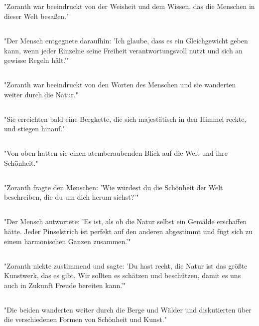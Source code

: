 \documentclass{article}
\begin{document}
\subsection{}
"Zoranth war beeindruckt von der Weisheit und dem Wissen, das die Menschen in dieser Welt besaßen."
\subsection{}
"Der Mensch entgegnete daraufhin: 'Ich glaube, dass es ein Gleichgewicht geben kann, wenn jeder Einzelne seine Freiheit verantwortungsvoll nutzt und sich an gewisse Regeln hält.'"
\subsection{}
"Zoranth war beeindruckt von den Worten des Menschen und sie wanderten weiter durch die Natur."
\subsection{}
"Sie erreichten bald eine Bergkette, die sich majestätisch in den Himmel reckte, und stiegen hinauf."
\subsection{}
"Von oben hatten sie einen atemberaubenden Blick auf die Welt und ihre Schönheit."
\subsection{}
"Zoranth fragte den Menschen: 'Wie würdest du die Schönheit der Welt beschreiben, die du um dich herum siehst?'"
\subsection{}
"Der Mensch antwortete: 'Es ist, als ob die Natur selbst ein Gemälde erschaffen hätte. Jeder Pinselstrich ist perfekt auf den anderen abgestimmt und fügt sich zu einem harmonischen Ganzen zusammen.'"
\subsection{}
"Zoranth nickte zustimmend und sagte: 'Du hast recht, die Natur ist das größte Kunstwerk, das es gibt. Wir sollten es schätzen und beschützen, damit es uns auch in Zukunft Freude bereiten kann.'"
\subsection{}
"Die beiden wanderten weiter durch die Berge und Wälder und diskutierten über die verschiedenen Formen von Schönheit und Kunst."
\end{document}
